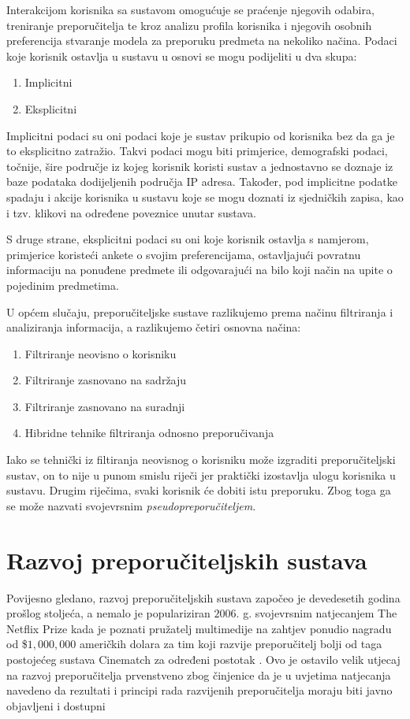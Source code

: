 \documentclass[times, utf8, diplomski, numeric]{fer}
\begin{document}
Interakcijom korisnika sa sustavom omogućuje se praćenje njegovih odabira,
treniranje preporučitelja te kroz analizu profila korisnika i njegovih osobnih
preferencija stvaranje modela za preporuku predmeta na nekoliko načina. Podaci
koje korisnik ostavlja u sustavu u osnovi se mogu podijeliti u dva skupa:
\begin{enumerate}
  \item Implicitni
  \item Eksplicitni
\end{enumerate}
Implicitni podaci su oni podaci koje je sustav prikupio od korisnika bez da ga
je to eksplicitno zatražio. Takvi podaci mogu biti primjerice, demografski
podaci, točnije, šire područje iz kojeg korisnik koristi sustav a jednostavno se
doznaje iz baze podataka dodijeljenih područja  IP adresa.
Također, pod implicitne podatke spadaju i akcije korisnika u sustavu koje se
mogu doznati iz sjedničkih zapisa, kao i tzv. klikovi na određene poveznice
unutar sustava.

S druge strane, eksplicitni podaci su oni koje korisnik ostavlja s namjerom,
primjerice koristeći ankete o svojim preferencijama, ostavljajući povratnu
informaciju na ponuđene predmete  ili odgovarajući na bilo
koji način na upite o pojedinim predmetima.

U općem slučaju, preporučiteljske sustave razlikujemo prema načinu filtriranja i
analiziranja informacija, a razlikujemo četiri osnovna načina:
\begin{enumerate}
  \item Filtriranje neovisno o korisniku 
  \item Filtriranje zasnovano na sadržaju 
  \item Filtriranje zasnovano na suradnji 
  \item Hibridne tehnike filtriranja odnosno preporučivanja
\end{enumerate}
Iako se tehnički iz filtiranja neovisnog o korisniku može izgraditi
preporučiteljski sustav, on to nije u punom smislu riječi jer praktički
izostavlja ulogu korisnika u sustavu. Drugim riječima, svaki korisnik će dobiti
istu preporuku. Zbog toga ga se može nazvati svojevrsnim
\emph{pseudopreporučiteljem}.

\section{Razvoj preporučiteljskih sustava}
Povijesno gledano, razvoj preporučiteljskih sustava započeo je devedesetih
godina prošlog stoljeća, a nemalo je populariziran $2006$. g. svojevrsnim
natjecanjem \glqq The Netflix Prize \grqq kada je poznati pružatelj multimedije
na zahtjev ponudio nagradu od \$$1,000,000$ američkih dolara za tim koji razvije
preporučitelj bolji od taga postojećeg sustava \glqq Cinematch \grqq za određeni
postotak \cite{Bennett2007}.
Ovo je ostavilo velik utjecaj na razvoj preporučitelja prvenstveno zbog
činjenice da je u uvjetima natjecanja navedeno da rezultati i principi rada
razvijenih preporučitelja moraju biti javno objavljeni i dostupni
\end{document}

